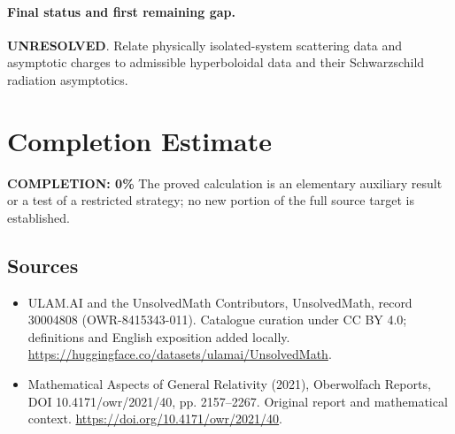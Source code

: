 \documentclass[11pt]{article}
\begin{document}
\paragraph{Final status and first remaining gap.}
\textbf{UNRESOLVED}. Relate physically isolated-system scattering data and asymptotic charges to admissible hyperboloidal data and their Schwarzschild radiation asymptotics.

\section{Completion Estimate}
\noindent\textbf{COMPLETION: 0\%}
The proved calculation is an elementary auxiliary result or a test of a restricted strategy; no new portion of the full source target is established.

\subsection{Sources}
\begin{itemize}
\item[\hypertarget{source:30004808:1}{S1}] ULAM.AI and the UnsolvedMath Contributors, UnsolvedMath, record 30004808 (OWR-8415343-011). Catalogue curation under CC BY 4.0; definitions and English exposition added locally.
\url{https://huggingface.co/datasets/ulamai/UnsolvedMath}.
\item[\hypertarget{source:30004808:2}{S2}] Mathematical Aspects of General Relativity (2021), Oberwolfach Reports, DOI 10.4171/owr/2021/40, pp. 2157--2267. Original report and mathematical context.
\url{https://doi.org/10.4171/owr/2021/40}.
\end{itemize}
\label{end:30004808}
\end{document}

